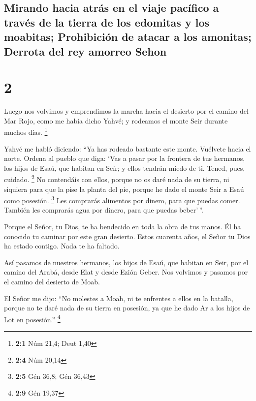 \hypertarget{mirando-hacia-atruxe1s-en-el-viaje-pacuxedfico-a-travuxe9s-de-la-tierra-de-los-edomitas-y-los-moabitas-prohibiciuxf3n-de-atacar-a-los-amonitas-derrota-del-rey-amorreo-sehon}{%
\subsection{Mirando hacia atrás en el viaje pacífico a través de la
tierra de los edomitas y los moabitas; Prohibición de atacar a los
amonitas; Derrota del rey amorreo
Sehon}\label{mirando-hacia-atruxe1s-en-el-viaje-pacuxedfico-a-travuxe9s-de-la-tierra-de-los-edomitas-y-los-moabitas-prohibiciuxf3n-de-atacar-a-los-amonitas-derrota-del-rey-amorreo-sehon}}

\hypertarget{section-1}{%
\section{2}\label{section-1}}

 Luego nos volvimos y emprendimos la marcha hacia el
desierto por el camino del Mar Rojo, como me había dicho Yahvé; y
rodeamos el monte Seir durante muchos días. \footnote{\textbf{2:1} Núm
  21,4; Deut 1,40}

 Yahvé me habló diciendo:  ``Ya has rodeado
bastante este monte. Vuélvete hacia el norte.  Ordena al
pueblo que diga: `Vas a pasar por la frontera de tus hermanos, los hijos
de Esaú, que habitan en Seír; y ellos tendrán miedo de ti. Tened, pues,
cuidado. \footnote{\textbf{2:4} Núm 20,14}  No contendáis
con ellos, porque no os daré nada de su tierra, ni siquiera para que la
pise la planta del pie, porque he dado el monte Seir a Esaú como
posesión. \footnote{\textbf{2:5} Gén 36,8; Gén 36,43}  Les
comprarás alimentos por dinero, para que puedas comer. También les
comprarás agua por dinero, para que puedas beber'\,''.

 Porque el Señor, tu Dios, te ha bendecido en toda la obra
de tus manos. Él ha conocido tu caminar por este gran desierto. Estos
cuarenta años, el Señor tu Dios ha estado contigo. Nada te ha faltado.

 Así pasamos de nuestros hermanos, los hijos de Esaú, que
habitan en Seir, por el camino del Arabá, desde Elat y desde Ezión
Geber. Nos volvimos y pasamos por el camino del desierto de Moab.

 El Señor me dijo: ``No molestes a Moab, ni te enfrentes a
ellos en la batalla, porque no te daré nada de su tierra en posesión, ya
que he dado Ar a los hijos de Lot en posesión.'' \footnote{\textbf{2:9}
  Gén 19,37}

